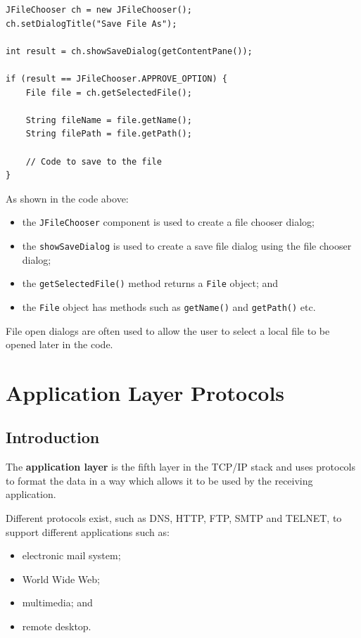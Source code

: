 \documentclass[a4paper]{systems-software}
\begin{document}
\begin{lstlisting}[title={Creating a save file dialog.}]
JFileChooser ch = new JFileChooser();
ch.setDialogTitle("Save File As");

int result = ch.showSaveDialog(getContentPane());

if (result == JFileChooser.APPROVE_OPTION) {
	File file = ch.getSelectedFile();

	String fileName = file.getName();
	String filePath = file.getPath();

	// Code to save to the file
}
\end{lstlisting}

As shown in the code above:
\begin{itemize}
	\item the \texttt{JFileChooser} component is used to create a file chooser dialog;
	\item the \texttt{showSaveDialog} is used to create a save file dialog using the file chooser dialog;
	\item the \texttt{getSelectedFile()} method returns a \texttt{File} object; and
	\item the \texttt{File} object has methods such as \texttt{getName()} and \texttt{getPath()} etc.
\end{itemize}

File open dialogs are often used to allow the user to select a local file to be opened later in the code.


\chapter{Application Layer Protocols}

\section{Introduction}

The \textbf{application layer} is the fifth layer in the TCP/IP stack and uses protocols to format the data in a way which allows it to be used by the receiving application.

Different protocols exist, such as DNS, HTTP, FTP, SMTP and TELNET, to support different applications such as:
\begin{itemize}
	\item electronic mail system;
	\item World Wide Web;
	\item multimedia; and
	\item remote desktop.
\end{itemize}
\end{document}

